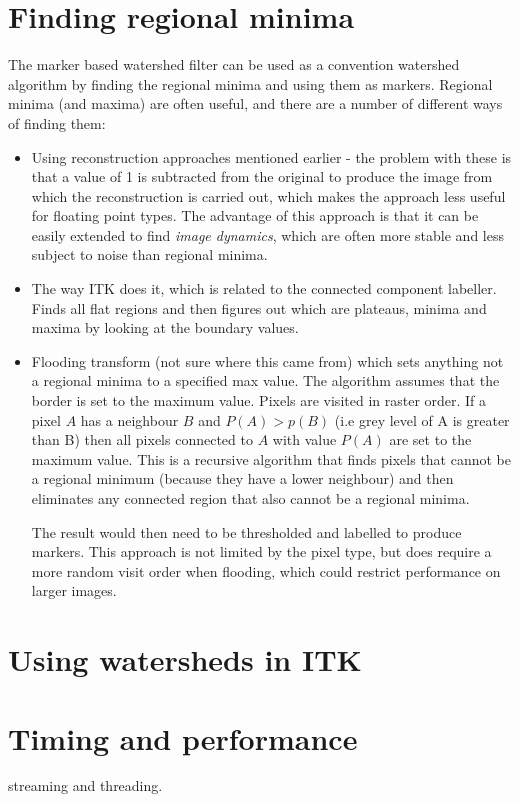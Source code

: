 \documentclass{InsightArticle}
\begin{document}
\section{Finding regional minima}
The marker based watershed filter can be used as a convention
watershed algorithm by finding the regional minima and using them as
markers. Regional minima (and maxima) are often useful, and there are
a number of different ways of finding them:
\begin{itemize}
\item Using reconstruction approaches mentioned earlier - 
the problem with these is that a value of 1 is subtracted from the
original to produce the image from which the reconstruction is carried
out, which makes the approach less useful for floating point
types. The advantage of this approach is that it can be easily
extended to find {\em image dynamics}, which are often more stable and
less subject to noise than regional minima.
\item The way ITK does it, which is related to the connected 
component labeller. Finds all flat regions and then figures out which
are plateaus, minima and maxima by looking at the boundary values.
\item Flooding transform (not sure where this came from) which 
sets anything not a regional minima to a specified max value. The
algorithm assumes that the border is set to the maximum value. Pixels
are visited in raster order. If a pixel $A$ has a neighbour $B$ and
$P(A) > p(B)$ (i.e grey level of A is greater than B) then all pixels
connected to $A$ with value $P(A)$ are set to the maximum value. This
is a recursive algorithm that finds pixels that cannot be a regional
minimum (because they have a lower neighbour) and then eliminates any
connected region that also cannot be a regional minima.

The result would then need to be thresholded and labelled to produce
markers. This approach is not limited by the pixel type, but does
require a more random visit order when flooding, which could restrict
performance on larger images.
\end{itemize}

\section{Using watersheds in ITK}

\section{Timing and performance}
streaming and threading.
\end{document}
